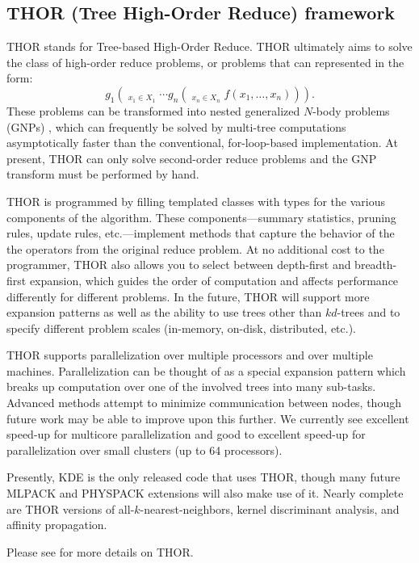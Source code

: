 \documentclass[letter]{report}
\begin{document}
\subsection{THOR (Tree High-Order Reduce) framework}
THOR stands for Tree-based High-Order Reduce. THOR ultimately aims to
solve the class of high-order reduce problems, or problems that can
represented in the form:
\[g_1 \left( \mathop{\bigotimes\nolimits_{\!1}}_{x_1 \in X_1} \cdots g_n \left( \mathop{\bigotimes\nolimits_{\!n}}_{x_n \in X_n} f(x_1,\ldots,x_n) \right) \right) .\]
These problems can be transformed into nested generalized $N$-body
problems (GNPs) \cite{gray_nips2000}, which can frequently be solved
by multi-tree computations asymptotically faster than the
conventional, for-loop-based implementation.  At present, THOR can
only solve second-order reduce problems and the GNP transform must be
performed by hand.

THOR is programmed by filling templated classes with types for the
various components of the algorithm.  These components---summary
statistics, pruning rules, update rules, etc.---implement methods that
capture the behavior of the the operators from the original reduce
problem.  At no additional cost to the programmer, THOR also allows
you to select between depth-first and breadth-first expansion, which
guides the order of computation and affects performance differently
for different problems.  In the future, THOR will support more
expansion patterns as well as the ability to use trees other than
$kd$-trees and to specify different problem scales (in-memory,
on-disk, distributed, etc.).

THOR supports parallelization over multiple processors and over
multiple machines.  Parallelization can be thought of as a special
expansion pattern which breaks up computation over one of the involved
trees into many sub-tasks.  Advanced methods attempt to minimize
communication between nodes, though future work may be able to improve
upon this further.  We currently see excellent speed-up for multicore
parallelization and good to excellent speed-up for parallelization
over small clusters (up to 64 processors).

Presently, KDE is the only released code that uses THOR, though many
future MLPACK and PHYSPACK extensions will also make use of it.
Nearly complete are THOR versions of all-$k$-nearest-neighbors, kernel
discriminant analysis, and affinity propagation.

Please see \cite{boyer2007tho} for more details on THOR.
\end{document}
